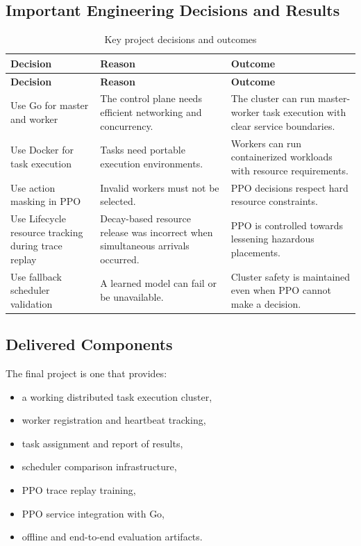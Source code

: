 \subsection{Important Engineering Decisions and Results}

\begin{longtable}{p{4cm}p{5.3cm}p{5.3cm}}
\caption{Key project decisions and outcomes}
\label{tab:decisions_results}\\
\toprule
\textbf{Decision} & \textbf{Reason} & \textbf{Outcome} \\
\midrule
\endfirsthead
\toprule
\textbf{Decision} & \textbf{Reason} & \textbf{Outcome} \\
\midrule
\endhead
Use Go for master and worker & The control plane needs efficient networking and concurrency. & The cluster can run master-worker task execution with clear service boundaries. \\
Use Docker for task execution & Tasks need portable execution environments. & Workers can run containerized workloads with resource requirements. \\
Use action masking in PPO & Invalid workers must not be selected. & PPO decisions respect hard resource constraints. \\
Use Lifecycle resource tracking during trace replay & Decay-based resource release was incorrect when simultaneous arrivals occurred. & PPO is controlled towards lessening hazardous placements. \\
Use fallback scheduler validation & A learned model can fail or be unavailable. & Cluster safety is maintained even when PPO cannot make a decision. \\
\bottomrule
\end{longtable}

\subsection{Delivered Components}

The final project is one that provides:

\begin{itemize}
    \item a working distributed task execution cluster,
    \item worker registration and heartbeat tracking,
    \item task assignment and report of results,
    \item scheduler comparison infrastructure,
    \item PPO trace replay training,
    \item PPO service integration with Go,
    \item offline and end-to-end evaluation artifacts.
\end{itemize}

